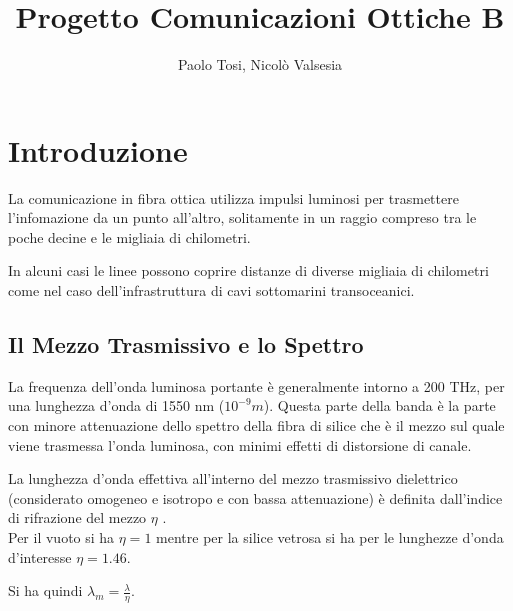 \documentclass[12pt, a4paper]{article}
\title{Progetto Comunicazioni Ottiche B}
\author{Paolo Tosi, Nicolò Valsesia}
\begin{document}
\maketitle
\tableofcontents
\newpage

\section{Introduzione}
\label{sec:1}

La comunicazione in fibra ottica utilizza impulsi luminosi per trasmettere l'infomazione da un punto all'altro, solitamente in un raggio compreso tra le poche decine e le migliaia di chilometri.

\vspace{5mm}
In alcuni casi le linee possono coprire distanze di diverse migliaia di chilometri come nel caso dell'infrastruttura di cavi sottomarini transoceanici.
\vspace{5mm}
\subsection{Il Mezzo Trasmissivo e lo Spettro}
\label{sub:}

La frequenza dell'onda luminosa portante è generalmente intorno a 200 THz, per una lunghezza d'onda di 1550 nm ($10^{-9} m$). Questa parte della banda è la parte con minore attenuazione dello spettro della fibra di silice che è il mezzo sul quale viene trasmessa l'onda luminosa, con minimi effetti di distorsione di canale.

La lunghezza d'onda effettiva all'interno del mezzo trasmissivo dielettrico (considerato omogeneo e isotropo e con bassa attenuazione) è definita dall'indice di rifrazione del mezzo $\eta$ .\\ Per il vuoto si ha $\eta = 1$ mentre per la silice vetrosa si ha per le lunghezze d'onda d'interesse $\eta = 1.46$.

Si ha quindi $ \lambda _m = \frac{\lambda}{\eta} $.
 
\end{document}
